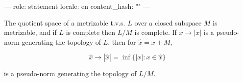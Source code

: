 ---
role: statement
locale: en
content_hash: ""
---

The quotient space of a metrizable t.v.s. $L$ over a closed subspace $M$ is metrizable, and if $L$ is complete then $L/M$ is complete. If $x \rightarrow |x|$ is a pseudo-norm generating the topology of $L$, then for $\hat{x} = x + M$,

$$\hat{x} \rightarrow |\hat{x}| = \inf\{|x|: x \in \hat{x}\}$$

is a pseudo-norm generating the topology of $L/M$.
